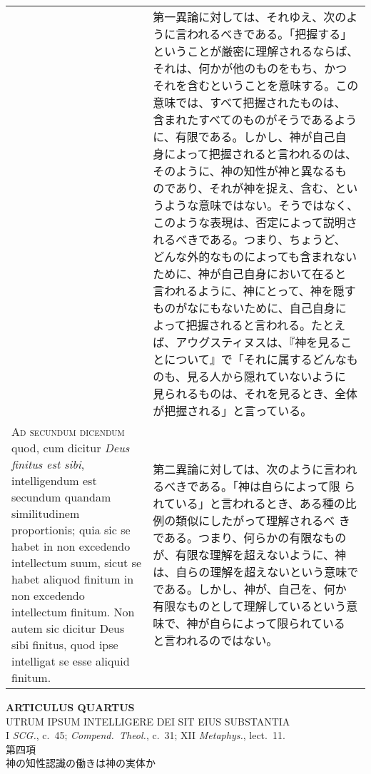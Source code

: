 \documentclass[10pt]{jsarticle} %
\begin{document}
\begin{longtable}{p{21em}p{21em}}
&

第一異論に対しては、それゆえ、次のように言われるべきである。「把握する」
ということが厳密に理解されるならば、それは、何かが他のものをもち、かつ
それを含むということを意味する。この意味では、すべて把握されたものは、
含まれたすべてのものがそうであるように、有限である。しかし、神が自己自
身によって把握されると言われるのは、そのように、神の知性が神と異なるも
のであり、それが神を捉え、含む、というような意味ではない。そうではなく、
このような表現は、否定によって説明されるべきである。つまり、ちょうど、
どんな外的なものによっても含まれないために、神が自己自身において在ると
言われるように、神にとって、神を隠すものがなにもないために、自己自身に
よって把握されると言われる。たとえば、アウグスティヌスは、『神を見るこ
とについて』で「それに属するどんなものも、見る人から隠れていないように
見られるものは、それを見るとき、全体が把握される」と言っている。

\\


{\scshape Ad secundum dicendum} quod, cum dicitur {\itshape Deus
finitus est sibi}, intelligendum est secundum quandam similitudinem
proportionis; quia sic se habet in non excedendo intellectum suum,
sicut se habet aliquod finitum in non excedendo intellectum
finitum. Non autem sic dicitur Deus sibi finitus, quod ipse intelligat
se esse aliquid finitum.

&

第二異論に対しては、次のように言われるべきである。「神は自らによって限
られている」と言われるとき、ある種の比例の類似にしたがって理解されるべ
きである。つまり、何らかの有限なものが、有限な理解を超えないように、神
は、自らの理解を超えないという意味でである。しかし、神が、自己を、何か
有限なものとして理解しているという意味で、神が自らによって限られている
と言われるのではない。



\end{longtable}
\newpage


\begin{center}
{\Large {\bf ARTICULUS QUARTUS}}\\ {\large UTRUM IPSUM INTELLIGERE DEI
SIT EIUS SUBSTANTIA}\\ {\footnotesize I {\itshape SCG.}, c.~45;
{\itshape Compend.~Theol.}, c.~31; XII {\itshape Metaphys.},
lect.~11.}\\ {\Large 第四項\\神の知性認識の働きは神の実体か}
\end{center}
\end{document}
